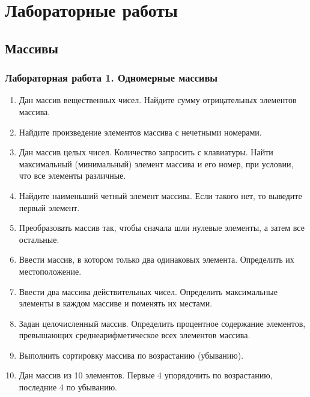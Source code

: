 \chapter{Лабораторные работы}

\section{Массивы}

\subsection{Лабораторная работа 1. Одномерные массивы}
\begin{enumerate}[leftmargin=*]
    \item Дан массив вещественных чисел. Найдите сумму отрицательных элементов массива.
    \item Найдите произведение элементов массива с нечетными номерами.
    \item Дан массив целых чисел. Количество запросить с клавиатуры. Найти максимальный (минимальный) элемент массива и его номер, при условии, что все элементы различные.
    \item Найдите наименьший четный элемент массива. Если такого нет, то выведите первый элемент.
    \item Преобразовать массив так, чтобы сначала шли нулевые элементы, а затем все остальные.
    \item Ввести массив, в котором только два одинаковых элемента. Определить их местоположение.
    \item Ввести два массива действительных чисел. Определить максимальные элементы в каждом массиве и поменять их местами.
    \item Задан целочисленный массив. Определить процентное содержание элементов, превышающих среднеарифметическое всех элементов массива.
    \item Выполнить сортировку массива по возрастанию (убыванию).
    \item Дан массив из 10 элементов. Первые 4 упорядочить по возрастанию, последние 4 по убыванию.
\end{enumerate}

